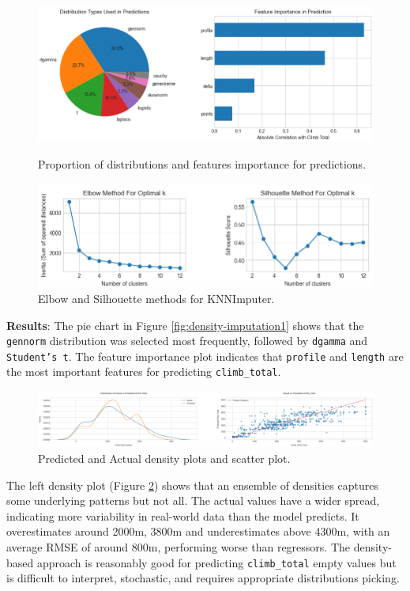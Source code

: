\documentclass[a4paper, twoside]{article}
\begin{document}
\begin{figure}[ht]
    \centering
    \begin{minipage}[t]{0.48\textwidth}
        \includegraphics[width=\textwidth]{assets/density_based1.png}
        \caption{Proportion of distributions and features importance for predictions.}
        \label{fig:density-imputation1}
    \end{minipage}%
    \hfill
    \begin{minipage}[t]{0.48\textwidth}
        \includegraphics[width=\textwidth]{assets/knn_imputation1.png}
        \caption{Elbow and Silhouette methods for KNNImputer.}
        \label{fig:knn-imputation1}
    \end{minipage}
\end{figure}
\textbf{Results}:
The pie chart in Figure \ref{fig:density-imputation1} shows that the \texttt{gennorm} distribution was selected most frequently, followed by \texttt{dgamma} and \texttt{Student's t}. The feature importance plot indicates that \texttt{profile} and \texttt{length} are the most important features for predicting \texttt{climb\_total}.
\begin{figure}[ht]
    \centering
    \includegraphics[width=1.0\textwidth]{assets/density_based2.png}
    \caption{Predicted and Actual density plots and scatter plot.}
    \label{fig:density-imputation2}
\end{figure}
The left density plot (Figure \ref{fig:density-imputation2}) shows that an ensemble of densities captures some underlying patterns but not all. The actual values have a wider spread, indicating more variability in real-world data than the model predicts. It overestimates around 2000m, 3800m and underestimates above 4300m, with an average RMSE of around 800m, performing worse than regressors. The density-based approach is reasonably good for predicting \texttt{climb\_total} empty values but is difficult to interpret, stochastic, and requires appropriate distributions picking.
\end{document}
